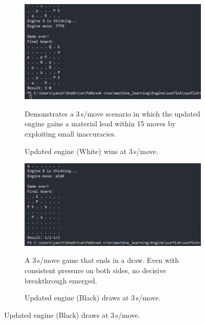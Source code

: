 \documentclass[12pt,a4paper]{article}
\begin{document}
\begin{figure}[htp]
    \centering
    
    \begin{subfigure}[b]{0.49\textwidth}
        \centering
        \includegraphics[width=\textwidth]{figures/yanfishwhitemv3000.png}
        \caption{Updated engine (White) wins at 3\,s/move.}
        \label{fig:screenshot1}
        
        \vspace{0.5em}
        \small
        Demonstrates a 3\,s/move scenario in which 
        the updated engine gains a material lead 
        within 15 moves by exploiting small inaccuracies.
    \end{subfigure}
    \hfill
    \begin{subfigure}[b]{0.49\textwidth}
        \centering
        \includegraphics[width=\textwidth]{figures/yanfishblackmv3000.png}
        \caption{Updated engine (Black) draws at 3\,s/move.}
        \label{fig:screenshot2}
        
        \vspace{0.5em}
        \small
        A 3\,s/move game that ends in a draw. Even with
        consistent pressure on both sides, no decisive
        breakthrough emerged.
    \end{subfigure}
    

\end{figure}
\end{document}
